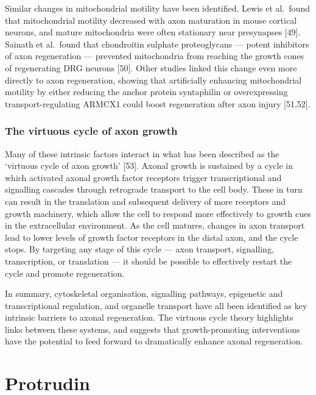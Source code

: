 \documentclass[
  12pt,
  a4paper,
]{book}
\begin{document}
Similar changes in mitochondrial motility have been identified. Lewis et al.~found that mitochondrial motility decreased with axon maturation in mouse cortical neurons, and mature mitochondria were often stationary near presynapses {[}49{]}. Sainath et al.~found that chondroitin sulphate proteoglycans --- potent inhibitors of axon regeneration --- prevented mitochondria from reaching the growth cones of regenerating DRG neurons {[}50{]}. Other studies linked this change even more directly to axon regeneration, showing that artificially enhancing mitochondrial motility by either reducing the anchor protein syntaphilin or overexpressing transport-regulating ARMCX1 could boost regeneration after axon injury {[}51,52{]}.

\subsubsection{The virtuous cycle of axon growth}\label{the-virtuous-cycle-of-axon-growth}

Many of these intrinsic factors interact in what has been described as the `virtuous cycle of axon growth' {[}53{]}. Axonal growth is sustained by a cycle in which activated axonal growth factor receptors trigger transcriptional and signalling cascades through retrograde transport to the cell body. These in turn can result in the translation and subsequent delivery of more receptors and growth machinery, which allow the cell to respond more effectively to growth cues in the extracellular environment. As the cell matures, changes in axon transport lead to lower levels of growth factor receptors in the distal axon, and the cycle stops. By targeting any stage of this cycle --- axon transport, signalling, transcription, or translation --- it should be possible to effectively restart the cycle and promote regeneration.

In summary, cytoskeletal organisation, signalling pathways, epigenetic and transcriptional regulation, and organelle transport have all been identified as key intrinsic barriers to axonal regeneration. The virtuous cycle theory highlights links between these systems, and suggests that growth-promoting interventions have the potential to feed forward to dramatically enhance axonal regeneration.

\section{Protrudin}\label{intro-ptdn}
\end{document}
